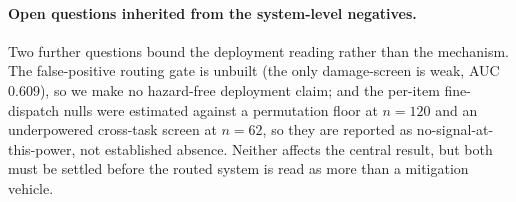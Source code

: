 \paragraph{Open questions inherited from the system-level negatives.}
Two further questions bound the deployment reading rather than the mechanism. The
false-positive routing gate is unbuilt (the only damage-screen is weak, AUC 0.609),
so we make no hazard-free deployment claim; and the per-item fine-dispatch nulls
were estimated against a permutation floor at $n{=}120$ and an underpowered
cross-task screen at $n{=}62$, so they are reported as no-signal-at-this-power, not
established absence. Neither affects the central result, but both must be settled
before the routed system is read as more than a mitigation vehicle.
